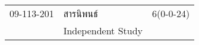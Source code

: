 \begin{longtable}{p{}p{}r{}}
09-113-201 & สารนิพนธ์ & 6(0-0-24)\\
 & Independent Study & \\[3mm]
\end{longtable}

